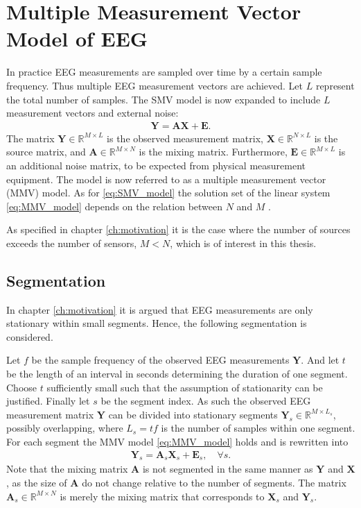 \section{Multiple Measurement Vector Model of EEG}\label{sec:MMV}
In practice EEG measurements are sampled over time by a certain sample frequency. 
Thus multiple EEG measurement vectors are achieved.
Let $L$ represent the total number of samples. 
The SMV model is now expanded to include $L$ measurement vectors and external noise:
\begin{align}\label{eq:MMV_model}
\mathbf{Y} = \mathbf{AX}+\textbf{E}.
\end{align}
The matrix $\mathbf{Y} \in \mathbb{R}^{M \times L}$ is the observed measurement matrix, $\mathbf{X} \in \mathbb{R}^{N \times L}$ is the source matrix, and $\mathbf{A} \in \mathbb{R}^{M \times N}$ is the mixing matrix. 
Furthermore, $\mathbf{E} \in \mathbb{R}^{M \times L}$ is an additional noise matrix, to be expected from physical measurement equipment.  
The model is now referred to as a multiple measurement vector (MMV) model.
As for \eqref{eq:SMV_model} the solution set of the linear system \eqref{eq:MMV_model} depends on the relation between $N$ and $M$ \cite[p. 42]{CS}. 

As specified in chapter \ref{ch:motivation} it is the case where the number of sources exceeds the number of sensors, $M < N$, which is of interest in this thesis.  

\subsection{Segmentation}\label{seg_segmentation}
In chapter \ref{ch:motivation} it is argued that EEG measurements are only stationary within small segments. 
Hence, the following segmentation is considered.

Let $f$ be the sample frequency of the observed EEG measurements $\mathbf{Y}$. And let $t$ be the length of an interval in seconds determining the duration of one segment. Choose $t$ sufficiently small such that the assumption of stationarity can be justified. 
Finally let $s$ be the segment index. 
As such the observed EEG measurement matrix $\mathbf{Y}$ can be divided into stationary segments $\mathbf{Y}_s \in \mathbb{R}^{M \times L_{s}}$, possibly overlapping, where $L_s = t f$ is the number of samples within one segment.
For each segment the MMV model \eqref{eq:MMV_model} holds and is rewritten into  
\begin{align}\label{eq:MMV_seg}
\mathbf{Y}_s = \textbf{A}_s\mathbf{X}_s + \textbf{E}_s, \quad \forall s.
\end{align}
Note that the mixing matrix $\mathbf{A}$ is not segmented in the same manner as $\mathbf{Y}$ and $\mathbf{X}$, as the size of $\mathbf{A}$ do not change relative to the number of segments. The matrix $\mathbf{A}_s\in \mathbb{R}^{M \times N}$ is merely the mixing matrix that corresponds to $\mathbf{X}_s$ and $\mathbf{Y}_s$.

